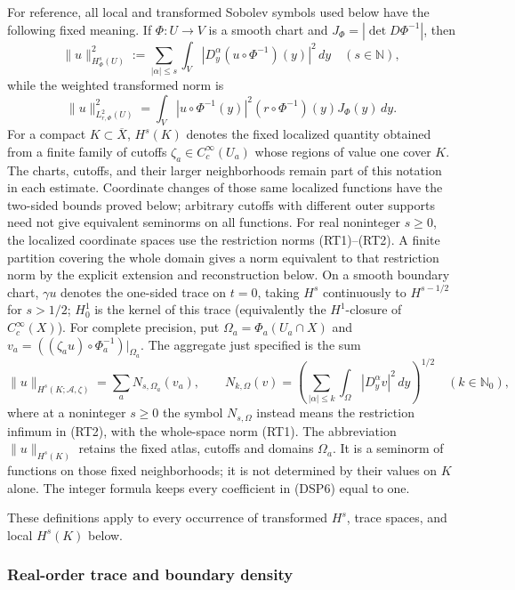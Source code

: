 \documentclass[
  11pt,
]{article}
\makeatletter
\let\ReaderOriginalAnchorStart\hyper@anchorstart
\let\ReaderOriginalAnchorEnd\hyper@anchorend
\let\ReaderPendingAliases\@empty
\def\ReaderArmAliases#1{\gdef\ReaderPendingAliases{#1}}
\def\hyper@anchorstart#1{\ReaderIfNativeAnchorTF{#1}{\ReaderPendingAliases\global\let\ReaderPendingAliases\@empty}{}\ReaderOriginalAnchorStart{#1}}
\makeatother
\begin{document}
For reference, all local and transformed Sobolev symbols used below have
the following fixed meaning. If \(\Phi:U\to V\) is a smooth chart and
\(J_\Phi=|\det D\Phi^{-1}|\), then \[
 \|u\|_{H^s_\Phi(U)}^2
 :=\sum_{|\alpha|\le s}\int_V
 \left|D_y^\alpha(u\circ\Phi^{-1})(y)\right|^2\,dy
 \quad(s\in\mathbb N),
 \] while the weighted transformed norm is \[
 \|u\|_{L^2_{r,\Phi}(U)}^2
 =\int_V|u\circ\Phi^{-1}(y)|^2
 (r\circ\Phi^{-1})(y)J_\Phi(y)\,dy.
\] For a compact \(K\subset\overline X\), \(H^s(K)\) denotes the fixed
localized quantity obtained from a finite family of cutoffs
\(\zeta_a\in C_c^\infty(U_a)\) whose regions of value one cover \(K\).
The charts, cutoffs, and their larger neighborhoods remain part of this
notation in each estimate. Coordinate changes of those same localized
functions have the two-sided bounds proved below; arbitrary cutoffs with
different outer supports need not give equivalent seminorms on all
functions. For real noninteger \(s\geq0\), the localized coordinate
spaces use the restriction norms (RT1)--(RT2). A finite partition
covering the whole domain gives a norm equivalent to that restriction
norm by the explicit extension and reconstruction below. On a smooth
boundary chart, \(\gamma u\) denotes the one-sided trace on \(t=0\),
taking \(H^s\) continuously to \(H^{s-1/2}\) for \(s>1/2\); \(H_0^1\) is
the kernel of this trace (equivalently the \(H^1\)-closure of
\(C_c^\infty(X)\)). For complete precision, put
\(\Omega_a=\Phi_a(U_a\cap X)\) and
\(v_a=((\zeta_a u)\circ\Phi_a^{-1})|_{\Omega_a}\). The aggregate just
specified is the sum \[
 \|u\|_{H^s(K;\mathcal A,\zeta)}
 =\sum_a N_{s,\Omega_a}(v_a),\qquad
 N_{k,\Omega}(v)=
 \left(\sum_{|\alpha|\leq k}\int_\Omega|D_y^\alpha v|^2\,dy\right)^{1/2}
 \quad(k\in\mathbb N_0),
 \tag{DSP7a}
\] where at a noninteger \(s\geq0\) the symbol \(N_{s,\Omega}\) instead
means the restriction infimum in (RT2), with the whole-space norm (RT1).
The abbreviation \(\|u\|_{H^s(K)}\) retains the fixed atlas, cutoffs and
domains \(\Omega_a\). It is a seminorm of functions on those fixed
neighborhoods; it is not determined by their values on \(K\) alone. The
integer formula keeps every coefficient in (DSP6) equal to one.

These definitions apply to every occurrence of transformed \(H^s\),
trace spaces, and local \(H^s(K)\) below.

\ReaderArmAliases{\ReaderOriginalAnchorStart{real-order-trace-and-boundary-density}\ReaderOriginalAnchorEnd}
\subsubsection{Real-order trace and boundary
density}\label{real-order-trace-and-boundary-density}
\end{document}
